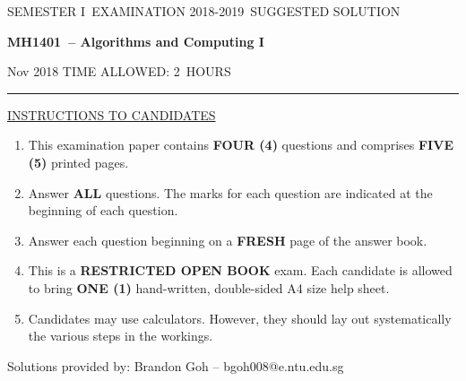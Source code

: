 \documentclass[12pt]{article}
\newcommand{\masunitnumber}{MH1401}
\newcommand{\examdate}{Nov 2018}
\newcommand{\academicyear}{2018-2019}
\newcommand{\semester}{I}
\newcommand{\coursename}{Algorithms and Computing I}
\newcommand{\numberofhours}{2}
\begin{document}
\setlength{\headsep}{5truemm}
\setlength{\headheight}{14.5truemm}
\setlength{\voffset}{-0.45truein}
\renewcommand{\headrulewidth}{0.0pt}
\begin{center}
SEMESTER \semester\ EXAMINATION \academicyear ~SUGGESTED SOLUTION
\end{center}
\begin{center}
{\bf \masunitnumber\ -- \coursename}
\end{center}
\vspace{20truemm}

\noindent \examdate\hspace{55truemm} TIME ALLOWED: \numberofhours\ HOURS

\vspace{19truemm}
\hrule
\vspace{19truemm}
\noindent\underline{INSTRUCTIONS TO CANDIDATES}
\vspace{8truemm}
\begin{enumerate}
\item This examination paper contains {\bf FOUR (4)} questions and comprises 
{\bf FIVE (5)} printed pages.

\item Answer {\bf ALL} questions. 
The marks for each question are indicated at the beginning of each question.


\item Answer each question beginning on a {\bf FRESH} page of the answer book.

\item This is a {\bf RESTRICTED OPEN BOOK} exam. Each candidate is allowed to bring {\bf ONE (1)} hand-written, double-sided A4 size help sheet.

\item Candidates may use calculators. However, they should lay out systematically the various steps in the workings.

\end{enumerate}

\newpage
\lhead{}
\rhead{\masunitnumber}
\chead{}
\lfoot{}
\cfoot{\thepage}
\rfoot{}
\setlength{\footskip}{45pt}
\noindent Solutions provided by:
Brandon Goh -- bgoh008@e.ntu.edu.sg
\end{document}

